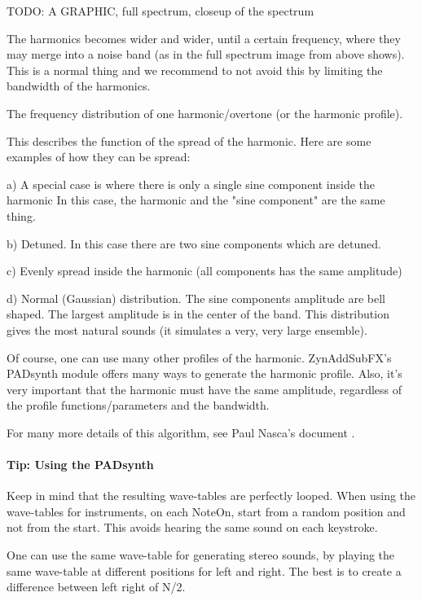       TODO:  A GRAPHIC, full spectrum, closeup of the spectrum

   The harmonics becomes wider and wider, until a certain frequency, where
   they may merge into a noise band (as in the full spectrum image from above
   shows). This is a normal thing and we recommend to not avoid this by
   limiting the bandwidth of the harmonics.

   The frequency distribution of one harmonic/overtone (or the harmonic
   profile).

   This describes the function of the spread of the harmonic.
   Here are some examples of how they can be spread:

   a) A special case is where there is only a single sine component inside the
   harmonic In this case, the harmonic and the "sine component" are the same
   thing.

   b) Detuned. In this case there are two sine components which are detuned.

   c) Evenly spread inside the harmonic (all components has the same amplitude)

   d) Normal (Gaussian) distribution. The sine components amplitude are bell
   shaped. The largest amplitude is in the center of the band. This distribution
   gives the most natural sounds (it simulates a very, very large ensemble).

   Of course, one can use many other profiles of the harmonic. ZynAddSubFX's
   PADsynth module offers many ways to generate the harmonic profile.  Also, it's
   very important that the harmonic must have the same amplitude, regardless of
   the profile functions/parameters and the bandwidth.

   For many more details of this algorithm, see Paul Nasca's document
   \cite{zyndoc}.

\paragraph{Tip: Using the PADsynth}
\label{tip_using_the_padsynth}

   Keep in mind that the resulting wave-tables are perfectly looped.
   When using the wave-tables for instruments, on each NoteOn, start from a
   random position and not from the start. This avoids hearing the same sound
   on each keystroke.

   One can use the same wave-table for generating stereo sounds, by playing
   the same wave-table at different positions for left and right. The best is
   to create a difference between left right of N/2.

